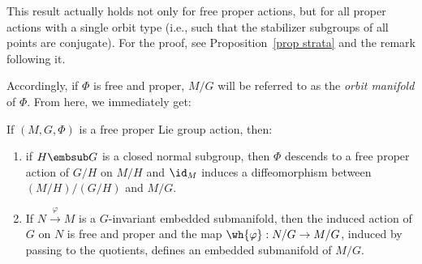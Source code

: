 \begin{rem}
    This result actually holds not only for free proper actions, but for all proper actions with a single orbit type (i.e., such that the stabilizer subgroups of all points are conjugate). For the proof, see Proposition~\ref{prop strata} and the remark following it.
\end{rem}


Accordingly, if $\Phi$ is free and proper, $M\slash G$ will be referred to as the \emph{orbit manifold} of $\Phi$. From here, we immediately get:

\begin{cor}[{{\cite[Cor.~6.5.3]{RS1}}}]\label{cor 6.5.3 RS1}
    If $(M,G,\Phi)$ is a free proper Lie group action, then:
    \begin{enumerate}
        \item if $H\embsub G$ is a closed normal subgroup, then $\Phi$ descends to a free proper action of $G\slash H$ on $M\slash H$ and $\id_M$ induces a diffeomorphism between $(M\slash H)\slash (G\slash H)$ and $M\slash G$.
        \item If $N\overset{\varphi}{\to}M$ is a $G$-invariant embedded submanifold, then the induced action of $G$ on $N$ is free and proper and the map $\wh{\varphi}:N\slash G\to M\slash G$, induced by passing to the quotients, defines an embedded submanifold of $M\slash G$.
    \end{enumerate}
\end{cor}

